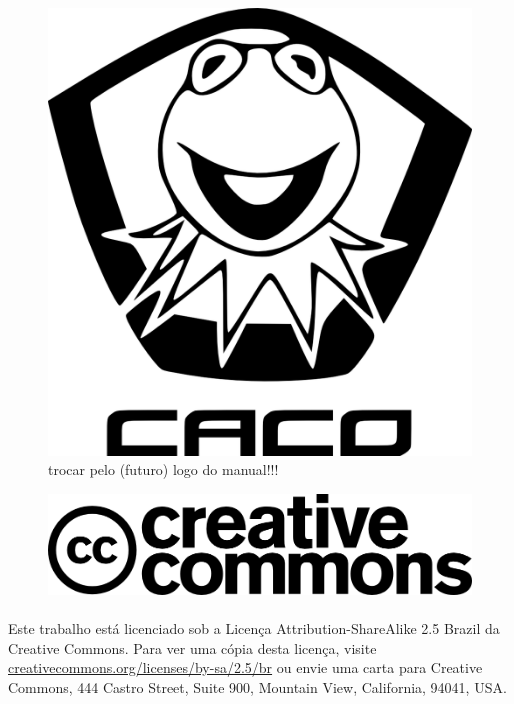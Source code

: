 \documentclass[a4paper,10pt,twocolumn]{book}
\begin{document}


\frontmatter
\onecolumn
\begin{figure}[H]
    \vskip 50pt %
    \centering
    \includegraphics[width=.65\textwidth]{img/caco/logo.png}
    \caption{trocar pelo (futuro) logo do manual!!!}
\end{figure}

\vfill %

\begin{figure}[H]
    \centering
    \includegraphics[width=.5\textwidth]{img/cc_logo.png}
\end{figure}

\paragraph{}
Este trabalho está licenciado sob a Licença Attribution-ShareAlike 2.5 Brazil
da Creative Commons. Para ver uma cópia desta licença,
visite \url{creativecommons.org/licenses/by-sa/2.5/br} ou envie uma
carta para Creative Commons, 444 Castro Street, Suite 900, Mountain View,
California, 94041, USA.
\end{document}

